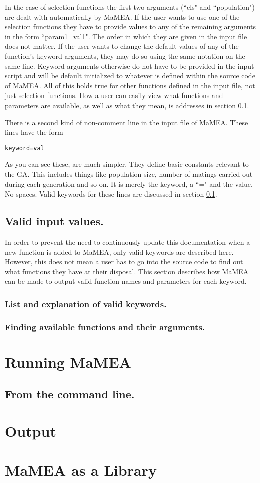 \documentclass{article}
\begin{document}
In the case of selection functions the first two arguments (``cls" and ``population") are dealt with automatically by MaMEA. If the user wants to use one of the selection functions they have to provide values to any of the remaining arguments in the form ``param1=val1". The order in which they are given in the input file does not matter. If the user wants to change the default values of any of the function's keyword arguments, they may do so using the same notation on the same line. Keyword arguments otherwise do not have to be provided in the input script and will be default initialized to whatever is defined within the source code of MaMEA. All of this holds true for other functions defined in the input file, not just selection functions. How a user can easily view what functions and parameters are available, as well as what they mean, is addresses in section \ref{input_files_valid_parameters}.

There is a second kind of non-comment line in the input file of MaMEA. These lines have the form
\begin{verbatim}
keyword=val
\end{verbatim}
As you can see these, are much simpler. They define basic constants relevant to the GA. This includes things like population size, number of matings carried out during each generation and so on. It is merely the keyword, a ``=" and the value. No spaces. Valid keywords for these lines are discussed in section \ref{input_files_valid_parameters}.

\subsection{Valid input values.}
\label{input_files_valid_parameters}
In order to prevent the need to continuously update this documentation when a new function is added to MaMEA, only valid keywords are described here. However, this does not mean a user has to go into the source code to find out what functions they have at their disposal. This section describes how MaMEA can be made to output valid function names and parameters for each keyword.
\subsubsection{List and explanation of valid keywords.}

\subsubsection{Finding available functions and their arguments.}

\section{Running MaMEA}

\subsection{From the command line.}


\section{Output}

\section{MaMEA as a Library}
\end{document}

